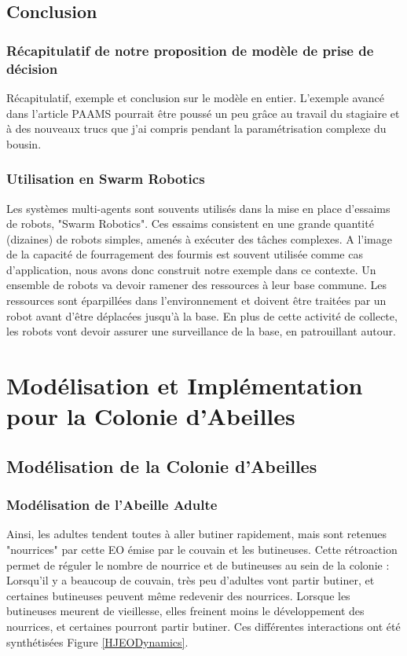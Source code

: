 \documentclass[11pt,a4paper]{report}
\begin{document}
	\section*{Conclusion}
		\subsection*{Récapitulatif de notre proposition de modèle de prise de décision}
		Récapitulatif, exemple et conclusion sur le modèle en entier.
		L'exemple avancé dans l'article PAAMS pourrait être poussé un peu grâce au travail du stagiaire et à des nouveaux trucs que j'ai compris pendant la paramétrisation complexe du bousin.
		
		\subsection*{Utilisation en Swarm Robotics}
			Les systèmes multi-agents sont souvents utilisés dans la mise en place d'essaims de robots, "Swarm Robotics". Ces essaims consistent en une grande quantité (dizaines) de robots simples, amenés à exécuter des tâches complexes. A l'image de la capacité de fourragement des fourmis est souvent utilisée comme cas d'application, nous avons donc construit notre exemple dans ce contexte. Un ensemble de robots va devoir ramener des ressources à leur base commune. Les ressources sont éparpillées dans l'environnement et doivent être traitées par un robot avant d'être déplacées jusqu'à la base. En plus de cette activité de collecte, les robots vont devoir assurer une surveillance de la base, en patrouillant autour.

\chapter{Modélisation et Implémentation pour la Colonie d'Abeilles}
	\section{Modélisation de la Colonie d'Abeilles}
		\subsection{Modélisation de l'Abeille Adulte}


		Ainsi, les adultes tendent toutes à aller butiner rapidement, mais sont retenues "nourrices" par cette EO émise par le couvain et les butineuses. Cette rétroaction permet de réguler le nombre de nourrice et de butineuses au sein de la colonie : Lorsqu'il y a beaucoup de couvain, très peu d'adultes vont partir butiner, et certaines butineuses peuvent même redevenir des nourrices. Lorsque les butineuses meurent de vieillesse, elles freinent moins le développement des nourrices, et certaines pourront partir butiner. Ces différentes interactions ont été synthétisées Figure \ref{HJEODynamics}.
		
\end{document}
